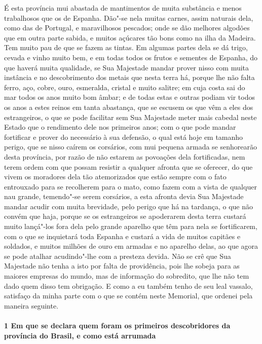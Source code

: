 É esta província mui abastada de mantimentos de muita substância e menos trabalhosos que
os de Espanha. Dão"-se nela muitas carnes, assim naturais dela, como das de Portugal, e
maravilhosos pescados; onde se dão melhores algodões que em outra parte sabida, e muitos
açúcares tão bons como na ilha da Madeira. Tem muito pau de que se fazem as tintas. Em
algumas partes dela se dá trigo, cevada e vinho muito bem, e em todas todos os frutos e
sementes de Espanha, do que haverá muita qualidade, se Sua Majestade mandar prover nisso
com muita instância e no descobrimento dos metais que nesta terra há, porque lhe não falta
ferro, aço, cobre, ouro, esmeralda, cristal e muito salitre; em cuja costa sai do mar
todos os anos muito bom âmbar; e de todas estas e outras podiam vir todos os anos a estes
reinos em tanta abastança, que se escusem os que vêm a eles dos estrangeiros, o que se
pode facilitar sem Sua Majestade meter mais cabedal neste Estado que o rendimento dele nos
primeiros anos; com o que pode mandar fortificar e prover do necessário à sua defensão, o
qual está hoje em tamanho perigo, que se nisso caírem os corsários, com mui pequena armada
se senhorearão desta província, por razão de não estarem as povoações dela fortificadas,
nem terem ordem com que possam resistir a qualquer afronta que se oferecer, do que vivem
os moradores dela tão atemorizados que estão sempre com o fato entrouxado para se
recolherem para o mato, como fazem com a vista de qualquer nau grande, temendo"-se serem
corsários, a esta afronta devia Sua Majestade mandar acudir com muita brevidade, pelo
perigo que há na tardança, o que não convém que haja, porque se os estrangeiros se
apoderarem desta terra custará muito lançá"-los fora dela pelo grande aparelho que têm para
nela se fortificarem, com o que se inquietará toda Espanha e custará a vida de muitos
capitães e soldados, e muitos milhões de ouro em armadas e no aparelho delas, ao que agora
se pode atalhar acudindo"-lhe com a presteza devida. Não se crê que Sua Majestade não tenha
a isto por falta de providência, pois lhe sobeja para as maiores empresas do mundo, mas de
informação do sobredito, que lhe não tem dado quem disso tem obrigação. E como a eu também
tenho de seu leal vassalo, satisfaço da minha parte com o que se contém neste Memorial,
que ordenei pela maneira seguinte.

\paragraph{1 Em que se declara quem foram os primeiros descobridores da província do
Brasil, e como está arrumada}

